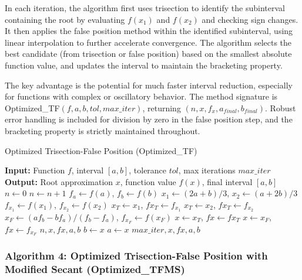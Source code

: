\documentclass[amsmath, amssymb, aps]{revtex4-2}
\begin{document}
In each iteration, the algorithm first uses trisection to identify the subinterval containing the root by evaluating $f(x_1)$ and $f(x_2)$ and checking sign changes. It then applies the false position method within the identified subinterval, using linear interpolation to further accelerate convergence. The algorithm selects the best candidate (from trisection or false position) based on the smallest absolute function value, and updates the interval to maintain the bracketing property.

The key advantage is the potential for much faster interval reduction, especially for functions with complex or oscillatory behavior. The method signature is Optimized\_TF$(f, a, b, tol, max\_iter)$, returning $(n, x, f_x, a_{final}, b_{final})$. Robust error handling is included for division by zero in the false position step, and the bracketing property is strictly maintained throughout.

\begin{algorithm}[H]
\caption{Optimized Trisection-False Position (Optimized\_TF)}
\begin{algorithmic}[1]
\State \textbf{Input:} Function $f$, interval $[a, b]$, tolerance $tol$, max iterations $max\_iter$
\State \textbf{Output:} Root approximation $x$, function value $f(x)$, final interval $[a, b]$
\State $n \gets 0$
    \State $n \gets n + 1$
    \State $f_a \gets f(a)$, $f_b \gets f(b)$
    \State $x_1 \gets (2a + b)/3$, $x_2 \gets (a + 2b)/3$
    \State $f_{x_1} \gets f(x_1)$, $f_{x_2} \gets f(x_2)$
        \State $x_T \gets x_1$, $fx_T \gets f_{x_1}$
    \Else
        \State $x_T \gets x_2$, $fx_T \gets f_{x_2}$
    \EndIf
    \State $x_F \gets (a f_b - b f_a)/(f_b - f_a)$, $f_{x_F} \gets f(x_F)$
        \State $x \gets x_T$, $fx \gets fx_T$
    \Else
        \State $x \gets x_F$, $fx \gets f_{x_F}$
    \EndIf
        \State \Return $n, x, fx, a, b$
    \EndIf
        \State $b \gets x$
    \Else
        \State $a \gets x$
    \EndIf
\EndWhile
\State \Return $max\_iter, x, fx, a, b$
\end{algorithmic}
\end{algorithm}


\subsubsection{Algorithm 4: Optimized Trisection-False Position with Modified Secant (Optimized\_TFMS)}
\end{document}
